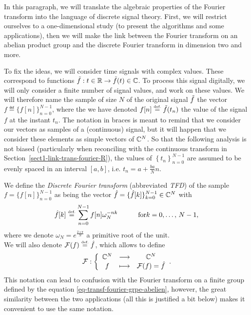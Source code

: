  
In this paragraph, we will translate the algebraic properties of the Fourier transform into the language of discrete signal theory. First, we will restrict ourselves to a one-dimensional study (to present the algorithms and some applications), then we will make the link between the Fourier transform on an abelian product group and the discrete Fourier transform in dimension two and more.
 
 
 \label{notation-42} To fix the ideas, we will consider time signals with complex values. These correspond to functions $ \tilde{f}: t \in \mathbb{R} \rightarrow \tilde{f} (t) \in \mathbb{C} $. To process this signal digitally, we will only consider a finite number of signal values, and work on these values. We will therefore name the sample of size $N$ of the original signal $ \tilde{f} $ the vector $ f \eqdef \{f[n]\}_{n = 0}^{N-1} $, where the we have denoted $ f[n] \stackrel{\mbox{\upshape\tiny def.}}{=} \tilde{f} (t_n) $ the value of the signal $ f $ at the instant $ t_n $. The notation in braces is meant to remind that we consider our vectors as samples of a (continuous) signal, but it will happen that we consider these elements as simple vectors of $ \mathbb{C}^N $. So that the following analysis is not biased (particularly when reconciling with the continuous transform in Section~\ref{sect1-link-trans-fourier-R}), the values of $ \left\{t_n \right\}_{n = 0}^{N-1} $ are assumed to be evenly spaced in an interval $ [a, b] $, i.e. $ t_n = a + \frac{ba}{N} n $.
 
\begin{defn}
 \label{notation-43} We define the \textit{Discrete Fourier transform} (abbreviated \textit{TFD}) of the sample $ f = \{f[n]\}_{n = 0}^{N-1} $ as being the vector $ \hat{f} = \{\hat{f}[k]\}_{k = 0}^{N-1} \in \mathbb{C}^N $ with
\begin{equation}
\label{eq-defn-tfd}
\hat{f}[k] \stackrel{\mbox{\upshape\tiny def.}}{=} \sum_{n = 0}^{N-1}{f[n] \omega_N^{- nk}} \quad \quad \quad \text{for} k = 0 , \ldots, \, N-1,
\end{equation}
where we denote $ \omega_N = e^{\frac{2 \imath \pi}{N}} $ a primitive  root of the unit. \\We will also denote $ \mathcal{F}(f) \stackrel{\mbox{\upshape\tiny def.}}{=} \hat{f} $, which allows to define
\begin{equation*}
\mathcal{F}: {\left\{ \begin{array}{ccc} \mathbb{C}^N & \longrightarrow & \mathbb{C}^N \\ f & \longmapsto & \mathcal{F}(f) = \hat{f} \end{array} \right.}.
\end{equation*}
This notation can lead to confusion with the Fourier transform on a finite group defined by the equation \eqref{eq-transf-fourier-grpe-abelien}, however, the great similarity between the two applications (all this is justified a bit below) makes it convenient to use the same notation.
\end{defn}
 
